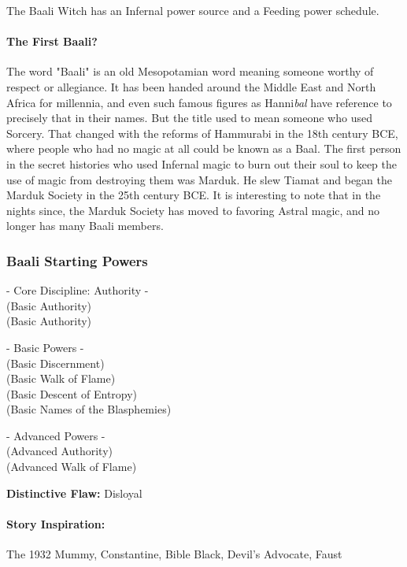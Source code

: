 The Baali Witch has an Infernal power source and a Feeding power schedule.

\paragraph{The First Baali?} The word "Baali" is an old Mesopotamian word meaning someone worthy of respect or allegiance. It has been handed around the Middle East and North Africa for millennia, and even such famous figures as Hanni\textit{bal} have reference to precisely that in their names. But the title used to mean someone who used Sorcery. That changed with the reforms of Hammurabi in the 18th century BCE, where people who had no magic at all could be known as a Baal. The first person in the secret histories who used Infernal magic to burn out their soul to keep the use of magic from destroying them was Marduk. He slew Tiamat and began the Marduk Society in the 25th century BCE. It is interesting to note that in the nights since, the Marduk Society has moved to favoring Astral magic, and no longer has many Baali members.

\subsubsection{Baali Starting Powers}

\hspace{\parindent} - Core Discipline: Authority -\\
 (Basic Authority)\\
 (Basic Authority)

- Basic Powers -\\
 (Basic Discernment)\\
 (Basic Walk of Flame)\\
 (Basic Descent of Entropy)\\
 (Basic Names of the Blasphemies)

- Advanced Powers -\\
 (Advanced Authority)\\
 (Advanced Walk of Flame)

\textbf{Distinctive Flaw:} Disloyal

\paragraph{Story Inspiration:} The 1932 Mummy, Constantine, Bible Black, Devil's Advocate, Faust

